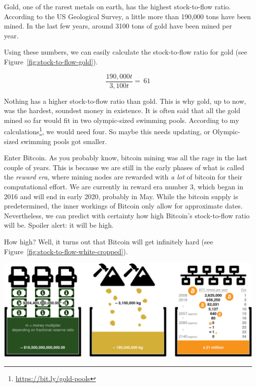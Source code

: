 Gold, one of the rarest metals on earth, has the highest stock-to-flow
ratio. According to the US Geological Survey, a little more than 190,000
tons have been mined. In the last few years, around 3100 tons of gold
have been mined per year.~\cite{mineral-commodity-summaries}

Using these numbers, we can easily calculate the stock-to-flow ratio for
gold (see Figure~\ref{fig:stock-to-flow-gold}).

\begin{center}
  \centering
  \begin{equation}
  \frac{190,000 t}{3,100 t} = ~ 61
  \end{equation}
  \label{fig:stock-to-flow-gold}
\end{center}

Nothing has a higher stock-to-flow ratio than gold. This is why gold, up to now,
was the hardest, soundest money in existence. It is often said that all the gold
mined so far would fit in two olympic-sized swimming pools. According to my
calculations\footnote{\url{https://bit.ly/gold-pools}}, we would need four. So
maybe this needs updating, or Olympic-sized swimming pools got smaller.

Enter Bitcoin. As you probably know, bitcoin mining was all the rage in
the last couple of years. This is because we are still in the early
phases of what is called the \textit{reward era}, where mining nodes are
rewarded with \textit{a lot} of bitcoin for their computational effort. We are
currently in reward era number 3, which began in 2016 and will end in
early 2020, probably in May. While the bitcoin supply is predetermined,
the inner workings of Bitcoin only allow for approximate dates.
Nevertheless, we can predict with certainty how high Bitcoin's
stock-to-flow ratio will be. Spoiler alert: it will be high.

How high? Well, it turns out that Bitcoin will get infinitely hard (see
Figure~\ref{fig:stock-to-flow-white-cropped}).

\begin{center}
  \includegraphics[width=\textwidth]{assets/images/stock-to-flow-white-cropped.png}
  \label{fig:stock-to-flow-white-cropped}
\end{center}

